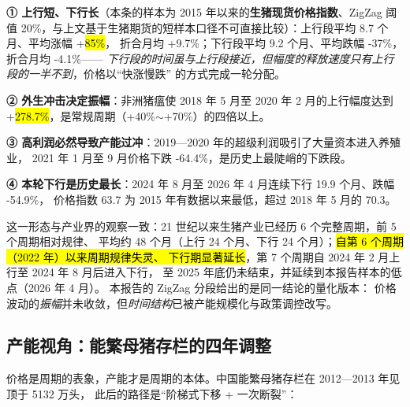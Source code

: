 \begin{keybox}[猪周期的四条经验规律]
\normalsize
\textbf{① 上行短、下行长}（本条的样本为 2015 年以来的\textbf{生猪现货价格指数}、ZigZag 阈值
20\%，与上文基于生猪期货的短样本口径不可直接比较）：上行段平均 8.7 个月、平均涨幅 +\hl{85\%}，
折合月均 +\num{9.7}\%；下行段平均 9.2 个月、平均跌幅 -37\%，折合月均 -\num{4.1}\%——
\emph{下行段的时间虽与上行段接近，但幅度的释放速度只有上行段的一半不到}，价格以“快涨慢跌”
的方式完成一轮分配。\par\vspace{3pt}
\textbf{② 外生冲击决定振幅}：非洲猪瘟使 2018 年 5 月至 2020 年 2 月的上行幅度达到
+\hl{278.7\%}，是常规周期（+40\%$\sim$+70\%）的四倍以上。\par\vspace{3pt}
\textbf{③ 高利润必然导致产能过冲}：2019---2020 年的超级利润吸引了大量资本进入养殖业，
2021 年 1 月至 9 月价格下跌 -64.4\%，是历史上最陡峭的下跌段。\par\vspace{3pt}
\textbf{④ 本轮下行是历史最长}：2024 年 8 月至 2026 年 4 月连续下行 19.9 个月、跌幅 -54.9\%，
价格指数 63.7 为 2015 年有数据以来最低，超过 2018 年 5 月的 70.3。
\end{keybox}

这一形态与产业界的观察一致：21 世纪以来生猪产业已经历 6 个完整周期，前 5 个周期相对规律、
平均约 48 个月（上行 24 个月、下行 24 个月）；\hl{自第 6 个周期（2022 年）以来周期规律失灵、
下行期显著延长}，第 7 个周期自 2024 年 2 月上行至 2024 年 8 月后进入下行，
至 2025 年底仍未结束，并延续到本报告样本的低点（2026 年 4 月）\cite{sun2026hog}。
本报告的 ZigZag 分段给出的是同一结论的量化版本：
价格波动的\emph{振幅}并未收敛，但\emph{时间结构}已被产能规模化与政策调控改写。

\subsection{产能视角：能繁母猪存栏的四年调整}
\label{sec:hog-capacity}

价格是周期的表象，产能才是周期的本体。中国能繁母猪存栏在 2012---2013 年见顶于 5132 万头，
此后的路径是“阶梯式下移 + 一次断裂”：

